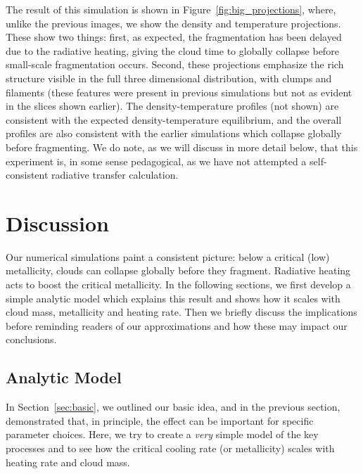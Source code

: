 \documentclass[useAMS,usenatbib]{mn2e}
\begin{document}
The result of this simulation is shown in Figure~\ref{fig:big_projections}, where, unlike the previous images, we show the density and temperature projections.
These show two things: first, as expected, the fragmentation has been delayed due to the radiative heating, giving the cloud time to globally collapse before
small-scale fragmentation occurs.  Second, these projections emphasize the rich structure visible in the full three dimensional distribution,
with clumps and filaments (these features were present in previous simulations but not as evident in the slices shown earlier). The density-temperature
profiles (not shown) are consistent with the expected density-temperature equilibrium, and the overall profiles are also consistent with the earlier simulations
which collapse globally before fragmenting.  We do note, as we will discuss in more detail below, that this experiment is, in some sense pedagogical, as we
have not attempted a self-consistent radiative transfer calculation.


% 
\section{Discussion}
\label{sec:discussion}

Our numerical simulations paint a consistent picture: below a critical (low) metallicity, clouds can collapse globally before they fragment.  Radiative heating acts to boost the critical metallicity.  In the following sections, we first develop a simple analytic model which explains this result and shows how it scales with cloud mass, metallicity and heating rate.  Then we briefly discuss the implications before reminding readers of our approximations and how these may impact our conclusions.

\subsection{Analytic Model}

In Section~\ref{sec:basic}, we outlined our basic idea, and in the previous section, demonstrated that, in principle, the effect can be important for specific parameter choices.  Here, we try to create a {\it very} simple model of the key processes and to see how the critical cooling rate (or metallicity) scales with heating rate and cloud mass.
\end{document}
